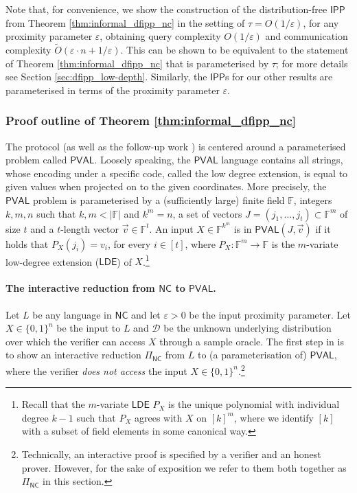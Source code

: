 \documentclass[10pt,a4paper]{article}
\newcommand{\NC}{\mathsf{NC}}
\newcommand{\PVAL}{\mathsf{PVAL}}
\newcommand{\IPP}{\mathsf{IPP}}
\newcommand{\LDE}{\mathsf{LDE}}
\newcommand{\F}{\mathbb{F}}
\newcommand{\sD}{\mathcal{D}}
\newcommand{\eps}{\varepsilon}
\begin{document}
Note that, for convenience, we show the construction of the distribution-free $\IPP$ from Theorem \ref{thm:informal_dfipp_nc} in the setting of $\tau = O(1/\eps)$, for any proximity parameter $\varepsilon$, obtaining query complexity $O(1/\eps)$ and communication complexity $\tilde{O}(\varepsilon\cdot n + 1/\eps)$. This can be shown to be equivalent to the statement of Theorem \ref{thm:informal_dfipp_nc} that is parameterised by $\tau$; for more details see Section \ref{sec:dfipp_low-depth}. Similarly, the $\IPP$s for our other results are parameterised in terms of the proximity parameter $\eps$.

\subsubsection{Proof outline of Theorem \ref{thm:informal_dfipp_nc}}
\label{sec:tech_main_dfipp}
The \cite{RVW} protocol (as well as the follow-up work \cite{RR20_batch_polylog}) is centered around a parameterised problem called $\PVAL$. Loosely speaking, the $\PVAL$ language contains all strings, whose encoding under a specific code, called the low degree extension, is equal to given values when projected on to the given coordinates. More precisely, the $\PVAL$ problem is parameterised by a (sufficiently large) finite field $\F$, integers $k,m,n$ such that $k,m < \vert \F \vert$ and $k^m = n$, a set of vectors $J = (j_1, \dots, j_t) \subset \F^m$ of size $t$ and a $t$-length vector $\Vec{v} \in \F^t$. An input $X \in \F^{k^m}$ is in $\PVAL(J,\Vec{v})$ if it holds that $P_X(j_i) = v_i$, for every $i \in [t]$, where $P_X:\F^m \rightarrow \F$ is the $m$-variate low-degree extension ($\LDE$) of $X$.\footnote{Recall that the $m$-variate $\LDE$ $P_X$ is the unique polynomial with individual degree $k-1$ such that $P_X$ agrees with $X$ on $[k]^m$, where we identify $[k]$ with a subset of field elements in some canonical way.}

\paragraph*{The interactive reduction from $\NC$ to $\PVAL$.} Let $L$ be any language in $\NC$ and let $\eps > 0$ be the input proximity parameter. Let $X \in \{0,1\}^n$ be the input to $L$ and $\sD$ be the unknown underlying distribution over which the verifier can access $X$ through a sample oracle. The first step in \cite{RVW} is to show an interactive reduction $\Pi_{\NC}$ from $L$ to (a parameterisation of) $\PVAL$, where the verifier \emph{does not access} the input $X \in \{0,1\}^n$.\footnote{Technically, an interactive proof is specified by a verifier and an honest prover. However, for the sake of exposition we refer to them both together as $\Pi_{\NC}$ in this section.} 
\end{document}
